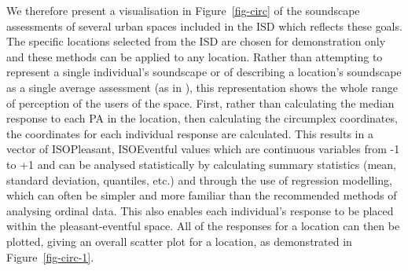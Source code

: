 \documentclass[
  authoryear,
  preprint,
  3p]{elsarticle}
\begin{document}
We therefore present a visualisation in Figure~\ref{fig-circ} of the
soundscape assessments of several urban spaces included in the ISD
\citep{Mitchell2021International} which reflects these goals. The
specific locations selected from the ISD are chosen for demonstration
only and these methods can be applied to any location. Rather than
attempting to represent a single individual's soundscape or of
describing a location's soundscape as a single average assessment (as in
\citet{Mitchell2021Investigating}), this representation shows the whole
range of perception of the users of the space. First, rather than
calculating the median response to each PA in the location, then
calculating the circumplex coordinates, the coordinates for each
individual response are calculated. This results in a vector of
ISOPleasant, ISOEventful values which are continuous variables from -1
to +1 and can be analysed statistically by calculating summary
statistics (mean, standard deviation, quantiles, etc.) and through the
use of regression modelling, which can often be simpler and more
familiar than the recommended methods of analysing ordinal data. This
also enables each individual's response to be placed within the
pleasant-eventful space. All of the responses for a location can then be
plotted, giving an overall scatter plot for a location, as demonstrated
in Figure~\ref{fig-circ-1}.
\end{document}
